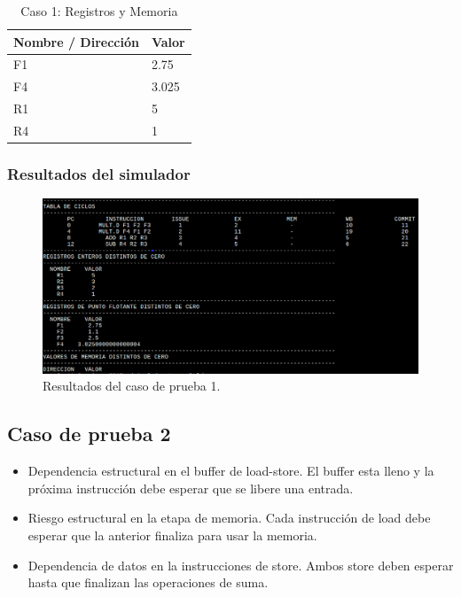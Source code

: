 \documentclass[a4paper]{article}
\begin{document}
	\begin{table}[H]
		\centering
		\caption*{Caso 1: Registros y Memoria}
		\begin{tabular}{|l|l|}
		\hline
		\textbf{Nombre / Dirección} & \textbf{Valor} \\ \hline
		F1                          & 2.75           \\ \hline
		F4                          & 3.025          \\ \hline
		R1                          & 5              \\ \hline
		R4                          & 1              \\ \hline
		\end{tabular}
	\end{table}

	\subsubsection*{Resultados del simulador}

	\begin{figure}[H]
	\centering
	\includegraphics[width=1\textwidth]{figures/test1.png}
	\caption{\label{fig:bloques}Resultados del caso de prueba 1.}
	\end{figure}


	\subsection*{Caso de prueba 2}

	\begin{itemize}
		\item Dependencia estructural en el buffer de load-store. El buffer esta lleno y la próxima instrucción debe esperar que se libere una entrada. 
		\item Riesgo estructural en la etapa de memoria. Cada instrucción de load debe esperar que la anterior finaliza para usar la memoria.
		\item Dependencia de datos en la instrucciones de store. Ambos store deben esperar hasta que finalizan las operaciones de suma.
	\end{itemize}
\end{document}
